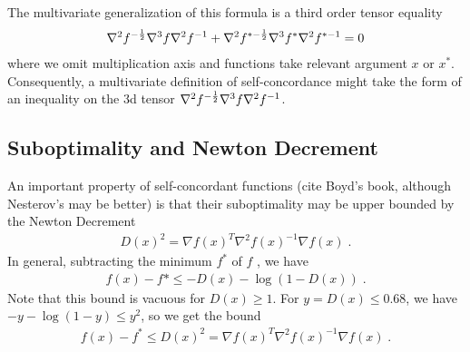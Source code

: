 \documentclass{article}
\newcommand{\decrement}{D}
\begin{document}
The multivariate generalization of this formula is a third order tensor equality
\begin{align}
    \nabla^2 f^{-\frac{1}{2}} \nabla^3 f \nabla^2 f^{-1} + \nabla^2 f^{* -\frac{1}{2}} \nabla^3 f^* \nabla^2 f^{* -1} = 0
\end{align}
where we omit  multiplication axis and functions take relevant argument $x$ or $x^*$. Consequently, a multivariate definition of self-concordance might take the form of an inequality on the 3d tensor $\nabla^2 f^{-\frac{1}{2}} \nabla^3 f \nabla^2 f^{-1}$.

\subsection{Suboptimality and Newton Decrement}
An important property of self-concordant functions (cite Boyd's book, although Nesterov's may be better) is that their suboptimality  may be upper bounded by the Newton Decrement 
\begin{align}
    \decrement(x)^2 = \nabla f(x)^T \nabla^2 f(x)^{-1} \nabla f(x) \; .
\end{align}
In general, subtracting the minimum $f^*$ of $f$ , we have
\begin{align}
    f(x) - f* \leq - \decrement(x) - \log( 1- \decrement(x)) \; .
\end{align}
Note that this bound is vacuous for $\decrement(x)\geq 1$. For $y = \decrement(x) \leq 0.68$, we have $ - y - \log(1-y) \leq y^2$, so we get the bound
\begin{align}
    f(x) - f^* \leq \decrement(x)^2 = \nabla f(x)^T \nabla^2 f(x)^{-1} \nabla f(x) \; .
\end{align}
\end{document}
